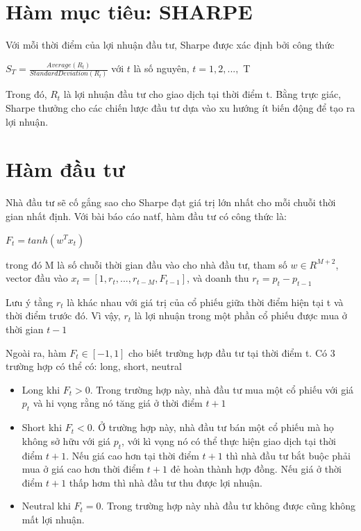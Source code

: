 \documentclass[14pt]{extreport}
\begin{document}
\section{Hàm mục tiêu: SHARPE}

Với mỗi thời điểm của lợi nhuận đầu tư, Sharpe được xác định bởi công thức


\begin{center}
$ S_T= \frac{Average(R_t)}{Standard Deviation (R_t)}$ với $t$ là số nguyên, $t=1,2,...,$ T  
\end{center}


Trong đó, $R_t$ là lợi nhuận đầu tư cho giao dịch tại thời điểm t. Bằng trực giác, Sharpe thưởng cho các chiến lược đầu tư dựa vào xu hướng ít biến động để tạo ra lợi nhuận.

\section{Hàm đầu tư}

Nhà đầu tư sẽ cố gắng sao cho Sharpe đạt giá trị lớn nhất cho mỗi chuỗi thời gian nhất định. Với bài báo cáo natf, hàm đầu tư có công thức là:

\begin{center}
$F_t = tanh(w^T x_t)$
\end{center}

trong đó M là số chuỗi thời gian đầu vào cho nhà đầu tư, tham số $w \in R^{M+2}$, vector đầu vào $x_t=[1,r_t,...,r_{t-M},F_{t-1}]$, và doanh thu $r_t=p_t - p_{t-1}$

Lưu ý tằng $r_t$ là khác nhau với giá trị của cổ phiếu giữa thời điểm hiện tại t và thời điểm trước đó. Vì vậy, $r_t$ là lợi nhuận trong một phần cổ phiếu được mua ở thời gian $t-1$

Ngoài ra, hàm $F_t \in [-1,1]$ cho biết trường hợp đầu tư tại thời điểm t. Có 3 trường hợp có thể có: long, short, neutral
\begin{itemize}
\item Long khi $F_t > 0$. Trong trường hợp này, nhà đầu tư mua một cổ phiếu với giá $p_t$ và hi vọng rằng nó tăng giá ở thời điểm $t+1$
\item Short khi $F_t <0$. Ở trường hợp này, nhà đầu tư bán một cổ phiếu mà họ không sở hữu với giá $p_t$, với kì vọng nó có thể thực hiện giao dịch tại thời điểm $t+1$. Nếu giá cao hơn tại thời điểm $t+1$ thì nhà đầu tư bắt buộc phải mua ở giá cao hơn thời điểm $t+1$ đẻ hoàn thành hợp đồng. Nếu giá ở thời điểm $t+1$ thấp hơm thì nhà đầu tư thu được lợi nhuận.
\item Neutral khi $F_t=0$. Trong trường hợp này nhà đầu tư không được cũng không mất lợi nhuận.
\end{itemize}
\end{document}
